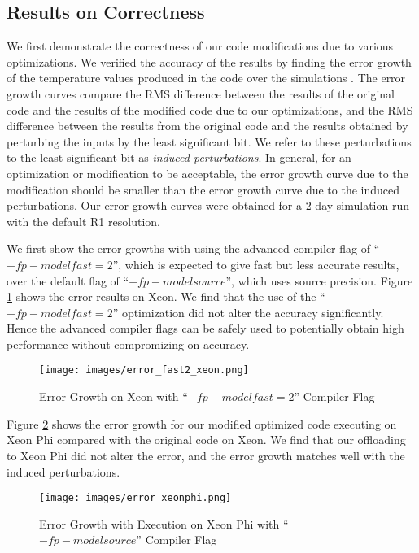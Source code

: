 \subsection{Results on Correctness}

We first demonstrate the correctness of our code modifications due to various optimizations. We verified the accuracy of the results by finding the error growth of the temperature values produced in the code over the simulations \cite{rosinski-roundingerrors-siamjscicomp1997}. The error growth curves compare the RMS difference between the results of the original code and the results of the modified code due to our optimizations, and the RMS difference between the results from the original code and the results obtained by perturbing the inputs by the least significant bit. We refer to these perturbations to the least significant bit as {\em induced perturbations}. In general, for an optimization or modification to be acceptable, the error growth curve due to the modification should be smaller than the error growth curve due to the induced perturbations. Our error growth curves were obtained for a 2-day simulation run with the default R1 resolution.

We first show the error growths with using the advanced compiler flag of ``$-fp-model fast=2$'', which is expected to give fast but less accurate results, over the default flag of ``$-fp-model source$'', which uses source precision. Figure \ref{error_fast2_xeon} shows the error results on Xeon. We find that the use of the ``$-fp-model fast=2$'' optimization did not alter the accuracy significantly. Hence the advanced compiler flags can be safely used to potentially obtain high performance without compromizing on accuracy.

\begin {figure}
\centering
\texttt{[image: images/error\_fast2\_xeon.png]}
\caption{Error Growth on Xeon with ``$-fp-model fast=2$'' Compiler Flag}
\label{error_fast2_xeon}
\end{figure}

Figure \ref{error_xeonphi} shows the error growth for our modified optimized code executing on Xeon Phi compared with the original code on Xeon. We find that our offloading to Xeon Phi did not alter the error, and the error growth matches well with the induced perturbations.

\begin {figure}
\centering
\texttt{[image: images/error\_xeonphi.png]}
\caption{Error Growth with Execution on Xeon Phi with ``$-fp-model source$'' Compiler Flag}
\label{error_xeonphi}
\end{figure}

